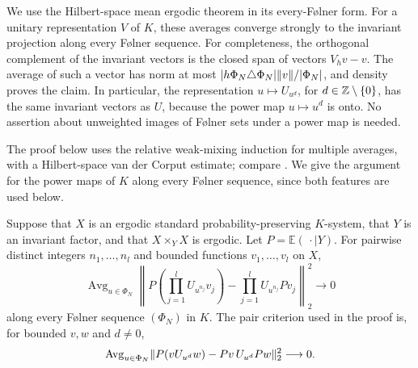 We use the Hilbert-space mean ergodic theorem in its every-F\o lner
form.  For a unitary representation $V$ of $K$, these averages converge
strongly to the invariant projection along every F\o lner sequence.
For completeness, the orthogonal complement of the invariant vectors
is the closed span of vectors $V_hv-v$.  The average of such a vector
has norm at most
$|h\Phi_N\triangle\Phi_N|\lVert v\rVert/|\Phi_N|$, and density proves the
claim.  In particular, the representation $u\mapsto U_{u^d}$, for
$d\in\mathbb Z\setminus\{0\}$, has the same invariant vectors as $U$, because
the power map $u\mapsto u^d$ is onto.  No assertion about unweighted
images of F\o lner sets under a power map is needed.

The proof below uses the relative weak-mixing induction for multiple
averages, with a Hilbert-space van der Corput estimate; compare
\citet{Furstenberg1977}.  We give the argument for the power maps of
$K$ along every F\o lner sequence, since both features are used below.

\begin{lemma}\label{lem:multiple-averages}
Suppose that $X$ is an ergodic standard probability-preserving
$K$-system, that $Y$ is an invariant factor, and that $X\times_YX$ is
ergodic.  Let $P=\mathbb E(\,\cdot\mid Y)$.  For pairwise distinct
integers $n_1,\ldots,n_l$ and bounded functions $v_1,\ldots,v_l$ on $X$,
\begin{equation}\label{eq:source-6}
 \operatorname{Avg}_{u\in\Phi_N}
 \left\|P\left(\prod_{j=1}^lU_{u^{n_j}}v_j\right)
       -\prod_{j=1}^lU_{u^{n_j}}Pv_j\right\|_2^2
 \longrightarrow0
\end{equation}
along every F\o lner sequence $(\Phi_N)$ in $K$.  The pair criterion
used in the proof is, for bounded $v,w$ and $d\ne0$,
\begin{equation}\label{eq:source-7}
 \operatorname{Avg}_{u\in\Phi_N}
 \lVert P(vU_{u^d}w)-Pv\,U_{u^d}Pw\rVert_2^2\longrightarrow0.
\end{equation}
\end{lemma}

